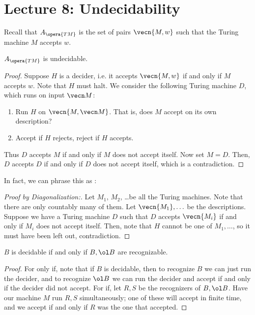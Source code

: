 \section*{Lecture 8: Undecidability}
\setcounter{section}{8}

Recall that $A_{\opera{TM}}$ is the set of pairs $\vecn{M,w}$ such that the Turing machine $M$ accepts $w$.

\begin{thm}
	$A_{\opera{TM}}$ is undecidable.
\end{thm}

\begin{proof}
	Suppose $H$ is a decider, i.e. it accepts $\vecn{M,w}$ if and only if $M$ accepts $w$. 
	Note that $H$ must halt.
	We consider the following Turing machine $D$, which runs on input $\vecn M$:
	\begin{enumerate}
		\item Run $H$ on $\vecn{M, \vecn M}$. That is, does $M$ accept on its own description?
		\item Accept if $H$ rejects, reject if $H$ accepts.
	\end{enumerate}
	Thus $D$ accepts $M$ if and only if $M$ does not accept itself. 
	Now set $M = D$. Then, $D$ accepts $D$ if and only if $D$ does not accept itself, which is a contradiction.
\end{proof}

In fact, we can phrase this as :

\begin{proof}
	[Proof by Diagonalization:]
	Let $M_1$, $M_2$, \ldots be all the Turing machines. Note that there are only countably many of them.
	Let $\vecn{M_1}, \ldots$ be the descriptions. Suppose we have a Turing machine $D$ such that $D$ accepts $\vecn{M_i}$ if and only if $M_i$ does not accept itself. 
	Then, note that $H$ cannot be one of $M_1, \ldots$, so it must have been left out, contradiction.
\end{proof}

\begin{thm}
	$B$ is decidable if and only if $B, \ol B$ are recognizable.
\end{thm}

\begin{proof}
	For only if, note that if $B$ is decidable, then to recognize $B$ we can just run the decider, and to recognize $\ol B$ we can run the decider and accept if and only if the decider did not accept.
	For if, let $R,S$ be the recognizers of $B, \ol B$. Have our machine $M$ run $R,S$ simultaneously; one of these will accept in finite time, and we accept if and only if $R$ was the one that accepted.
\end{proof}

